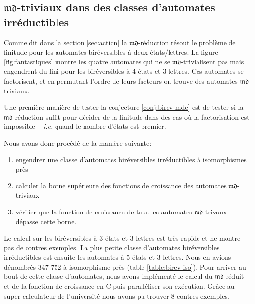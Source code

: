 \documentclass[11pt,a4paper]{article}
\begin{document}
\subsection{$\mathfrak{md}$-triviaux dans des classes d'automates irréductibles}

Comme dit dans la section \ref{sec:action} la $\mathfrak{md}$-réduction résout le problème de finitude pour les automates biréversibles à deux états/lettres. La figure \ref{fig:fantastiques} montre les quatre automates qui ne se $\mathfrak{md}$-trivialisent pas mais engendrent du fini pour les biréversibles à 4 états et 3 lettres. Ces automates se factorisent, et en permutant l'ordre de leurs facteurs on trouve des automates $\mathfrak{md}$-triviaux.

Une première manière de tester la conjecture \ref{conj:birev-mdc} est de tester si la $\mathfrak{md}$-réduction suffit pour décider de la finitude dans des cas où la factorisation est impossible -- \emph{i.e.} quand le nombre d'états est premier.

Nous avons donc procédé de la manière suivante:

\begin{enumerate}
\item engendrer une classe d'automates biréversibles irréductibles à isomorphismes près
\item calculer la borne supérieure des fonctions de croissance des automates $\mathfrak{md}$-triviaux
\item vérifier que la fonction de croissance de tous les automates $\mathfrak{md}$-trivaux dépasse cette borne.
\end{enumerate}

Le calcul sur les biréversibles à 3 états et 3 lettres est très rapide et ne montre pas de contres exemples. La plus petite classe d'automates biréversibles irréductibles est ensuite les automates à 5 états et 3 lettres. Nous en avions dénombrés 347 752 à isomorphisme près (table \ref{table:birev-iso}). Pour arriver au bout de cette classe d'automates, nous avons implémenté le calcul du $\mathfrak{md}$-réduit et de la fonction de croissance en C puis paralléliser son exécution. Grâce au super calculateur de l'université nous avons pu trouver 8 contres exemples.
\end{document}
